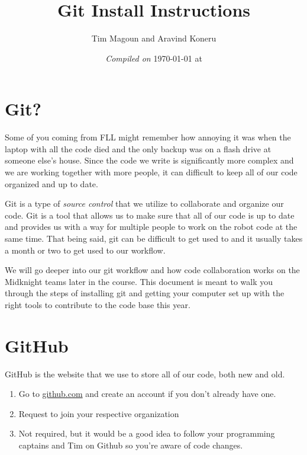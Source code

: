 \documentclass[11pt,fleqn]{article}
\begin{document}
\title{Git Install Instructions}%
\author{Tim Magoun and Aravind Koneru}
\date{\textit{Compiled on} \today \hspace{1mm} at \currenttime}
\maketitle

\section*{Git?}
Some of you coming from FLL might remember how annoying it was when the laptop with all the code died and
the only backup was on a flash drive at someone else's house. Since the code we write is
significantly more complex and we are working together with more people, it can difficult to keep
all of our code organized and up to date. 

Git is a type of \textit{source control} that we utilize to collaborate and organize our code. Git is 
a tool that allows us to make sure that all of our code is up to date and provides us with a way for
multiple people to work on the robot code at the same time. That being said, git can be difficult
to get used to and it usually takes a month or two to get used to our workflow. 

We will go deeper into our git workflow and how code collaboration works on the Midknight 
teams later in the course. This document is meant to walk you through the steps of installing git
and getting your computer set up with the right tools to contribute to the code base this year.  

\section*{GitHub}
GitHub is the website that we use to store all of our code, both new and old.

\begin{enumerate}
    \item
        Go to \url{github.com} and create an account if you don't already have one.

    \item
        Request to join your respective organization %

    \item
        Not required, but it would be a good idea to follow your programming captains and Tim on
        Github so you're aware of code changes. 

\end{enumerate}
\end{document}
